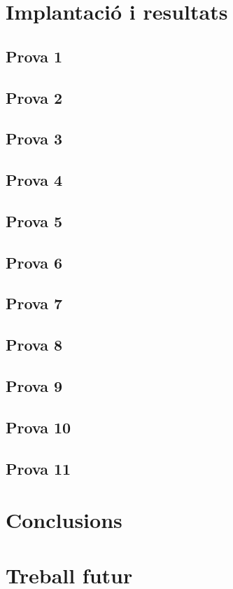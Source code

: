 \documentclass[a4paper,12pt,twoside]{ThesisStyle}
\begin{document}
\chapter{Implantació i resultats}
\label{chp:implantacio}

\section{Prova 1}
\section{Prova 2}
\section{Prova 3}
\section{Prova 4}
\section{Prova 5}
\section{Prova 6}
\section{Prova 7}
\section{Prova 8}
\section{Prova 9}
\section{Prova 10}
\section{Prova 11}



\chapter{Conclusions}
\label{chp:conclusions}



\chapter{Treball futur}
\label{chp:treballfutur}
\end{document}
